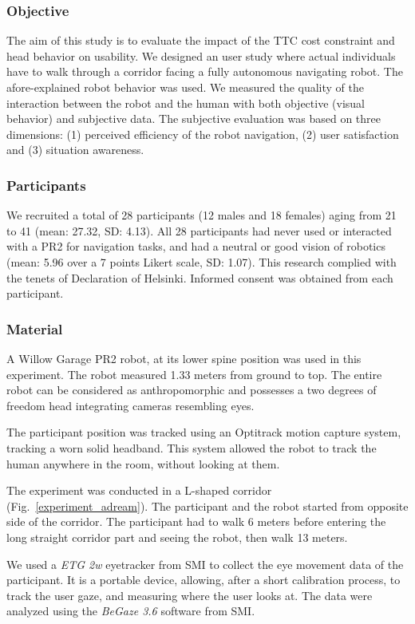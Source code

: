 \documentclass[a4paper,11pt,twoside]{StyleThese}
\begin{document}
\subsubsection{Objective}
The aim of this study is to evaluate the impact of the TTC cost constraint and head behavior on usability. We designed an user study where actual individuals have to walk through a corridor facing a fully autonomous navigating robot. The afore-explained robot behavior was used. We measured the quality of the interaction between the robot and the human with both objective (visual behavior) and subjective data. The subjective evaluation was based on three dimensions: (1) perceived efficiency of the robot navigation, (2) user satisfaction and (3) situation awareness.

\subsubsection{Participants}
We recruited a total of 28 participants (12 males and 18 females) aging from 21 to 41 (mean: 27.32, SD: 4.13). All 28 participants had never used or interacted with a PR2 for navigation tasks, and had a neutral or good vision of robotics (mean: 5.96 over a 7 points Likert scale, SD: 1.07). This research complied with the tenets of Declaration of Helsinki. Informed consent was obtained from each participant.

\subsubsection{Material}
A Willow Garage PR2 robot, at its lower spine position was used in this experiment. The robot measured 1.33 meters from ground to top. The entire robot can be considered as anthropomorphic and possesses a two degrees of freedom head integrating cameras resembling eyes.

The participant position was tracked using an Optitrack motion capture system, tracking a worn solid headband. This system allowed the robot to track the human anywhere in the room, without looking at them.

The experiment was conducted in a L-shaped corridor (Fig.~\ref{experiment_adream}). The participant and the robot started from opposite side of the corridor. The participant had to walk 6 meters before entering the long straight corridor part and seeing the robot, then walk 13 meters.

We used a \textit{ETG 2w} eyetracker from SMI to collect the eye movement data of the participant. It is a portable device, allowing, after a short calibration process, to track the user gaze, and measuring where the user looks at. The data were analyzed using the \textit{BeGaze 3.6} software from SMI.
\end{document}

